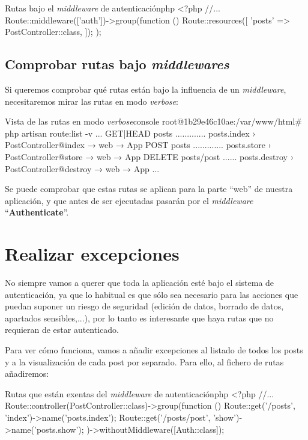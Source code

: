 \begin{mycode}{Rutas bajo el \textit{middleware} de autenticación}{php}{}
<?php
//...
Route::middleware(['auth'])->group(function () {
    Route::resources([
      'posts' => PostController::class,
    ]);
});
\end{mycode}


\section{Comprobar rutas bajo \textit{middlewares}}
Si queremos comprobar qué rutas están bajo la influencia de un \textit{middleware}, necesitaremos mirar las rutas en modo \textit{verbose}:


\begin{mycode}{Vista de las rutas en modo \textit{verbose}}{console}{}
root@1b29e46c10ae:/var/www/html# php artisan route:list -v
...
GET|HEAD  posts ............. posts.index › PostController@index
 → web
 → App\Http\Middleware\Authenticate
POST      posts ............. posts.store › PostController@store
 → web
 → App\Http\Middleware\Authenticate
DELETE    posts/{post} ...... posts.destroy › PostController@destroy
 → web
 → App\Http\Middleware\Authenticate
...
\end{mycode}

Se puede comprobar que estas rutas se aplican para la parte “web” de nuestra aplicación, y que antes de ser ejecutadas pasarán por el \textit{middleware} “\textbf{Authenticate}”.

\chapter{Realizar excepciones}

No siempre vamos a querer que toda la aplicación esté bajo el sistema de autenticación, ya que lo habitual es que sólo sea necesario para las acciones que puedan suponer un riesgo de seguridad (edición de datos, borrado de datos, apartados sensibles,...), por lo tanto es interesante que haya rutas que no requieran de estar autenticado.

Para ver cómo funciona, vamos a añadir excepciones al listado de todos los posts y a la visualización de cada post por separado. Para ello, al fichero de rutas añadiremos:

\begin{mycode}{Rutas que están exentas del \textit{middleware} de autenticación}{php}{}
<?php
//...
Route::controller(PostController::class)->group(function () {
    Route::get('/posts', 'index')->name('posts.index');
    Route::get('/posts/{post}', 'show')->name('posts.show');
})->withoutMiddleware([Auth::class]);
\end{mycode}

